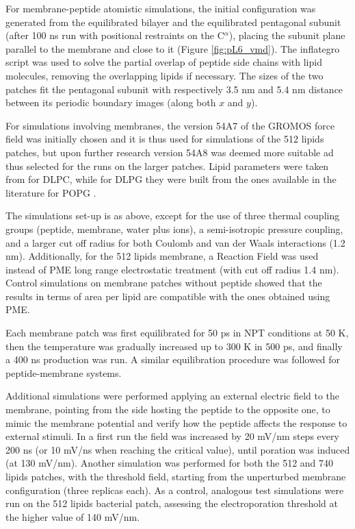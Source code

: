 For membrane-peptide atomistic simulations, the initial configuration was generated from the equilibrated bilayer and the equilibrated pentagonal subunit (after 100 ns run with positional restraints on the C$^\alpha$), placing the subunit plane parallel to the membrane and close to it (Figure \ref{fig:pL6_vmd}).
%
The inflategro script \citep{Kandt2007} was used to solve the partial overlap of peptide side chains with lipid molecules, removing the overlapping lipids if necessary.
%
The sizes of the two patches fit the pentagonal subunit with respectively 3.5 nm and 5.4 nm distance between its periodic boundary images (along both $x$ and $y$).

For simulations involving membranes, the version 54A7 of the GROMOS force field \citep{Schmid2011} was initially chosen and it is thus used for simulations of the 512 lipids patches, but upon further research version 54A8 \citep{Oostenbrink2005, Reif2013} was deemed more suitable ad thus selected for the runs on the larger patches. Lipid parameters were taken from \citep{PogerOrig} for DLPC, while for DLPG they were built from the ones available in the literature for POPG \citep{Kukol2009}.

The simulations set-up is as above, except for the use of three thermal coupling groups (peptide, membrane, water plus ions), a semi-isotropic pressure coupling, and a larger cut off radius for both Coulomb and van der Waals interactions (1.2 nm). Additionally, for the 512 lipids membrane, a Reaction Field \citep{Tironi1995} was used instead of PME long range electrostatic treatment (with cut off radius 1.4 nm). Control simulations on membrane patches without peptide showed that the results in terms of area per lipid are compatible with the ones obtained using PME.

Each membrane patch was first equilibrated for 50 ps in NPT conditions at 50 K, then the temperature was gradually increased up to 300 K in 500 ps, and finally a 400 ns production was run. A similar equilibration procedure was followed for peptide-membrane systems.

Additional simulations were performed applying an external electric field to the membrane, pointing from the side hosting the peptide to the opposite one, to mimic the membrane potential and verify how the peptide affects the response to external stimuli.
%
In a first run the field was increased by 20 mV/nm steps every 200 ns (or 10 mV/ns when reaching the critical value), until poration was induced (at 130 mV/nm).
%
Another simulation was performed for both the 512 and 740 lipids patches, with the threshold field, starting from the unperturbed membrane configuration (three replicas each).
%
As a control, analogous test simulations were run on the 512 lipids bacterial patch, assessing the electroporation threshold at the higher value of 140 mV/nm.

